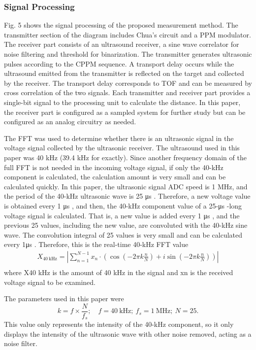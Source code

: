 \subsubsection{Signal Processing}
Fig. 5 shows the signal processing of the proposed measurement method. The transmitter section of the diagram includes Chua’s circuit and a PPM modulator. The receiver part consists of an ultrasound receiver, a sine wave correlator for noise filtering and threshold for binarization. The transmitter generates ultrasonic pulses according to the CPPM sequence. A transport delay occurs while the ultrasound emitted from the transmitter is reflected on the target and collected by the receiver. The transport delay corresponds to TOF and can be measured by cross correlation of the two signals. Each transmitter and receiver part provides a single-bit signal to the processing unit to calculate the distance. In this paper, the receiver part is configured as a sampled system for further study but can be configured as an analog circuitry as needed.

The FFT was used to determine whether there is an ultrasonic signal in the voltage signal collected by the ultrasonic receiver. The ultrasound used in this paper was 40 kHz (39.4 kHz for exactly). Since another frequency domain of the full FFT is not needed in the incoming voltage signal, if only the 40-kHz component is calculated, the calculation amount is very small and can be calculated quickly. In this paper, the ultrasonic signal ADC speed is 1 MHz, and the period of the 40-kHz ultrasonic wave is 25 μs . Therefore, a new voltage value is obtained every 1 μs , and then, the 40-kHz component value of a 25-μs -long voltage signal is calculated. That is, a new value is added every 1 μs , and the previous 25 values, including the new value, are convoluted with the 40-kHz sine wave. The convolution integral of 25 values is very small and can be calculated every 1μs . Therefore, this is the real-time 40-kHz FFT value
\begin{align*} X_{40~\text {kHz}} = \left |{\sum _{n=1}^{N-1} x_{n} \cdot \left ({\cos \left ({-2 \pi k \frac {n}{N}}\right) + i \sin \left ({-2 \pi k \frac {n}{N}}\right)}\right)}\right | \\ {}\tag{9}\end{align*}
where X40 kHz is the amount of 40 kHz in the signal and xn is the received voltage signal to be examined.

The parameters used in this paper were
\begin{equation*} k = f \times \frac {N}{f_{s}};\quad f = 40~\text {kHz};~ f_{s} = 1~\text {MHz};~ N = 25.\end{equation*}
This value only represents the intensity of the 40-kHz component, so it only displays the intensity of the ultrasonic wave with other noise removed, acting as a noise filter.
